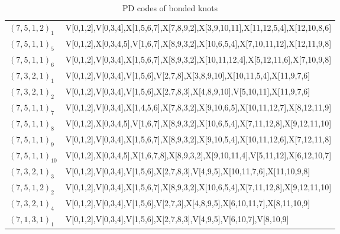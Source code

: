\begin{table}[h]
\begin{tabular}{ll}
$(7,5,1,2)_{1}$ & {\scriptsize\ttfamily V[0,1,2],V[0,3,4],X[1,5,6,7],X[7,8,9,2],X[3,9,10,11],X[11,12,5,4],X[12,10,8,6]} \\
$(7,5,1,1)_{5}$ & {\scriptsize\ttfamily V[0,1,2],X[0,3,4,5],V[1,6,7],X[8,9,3,2],X[10,6,5,4],X[7,10,11,12],X[12,11,9,8]} \\
$(7,5,1,1)_{6}$ & {\scriptsize\ttfamily V[0,1,2],V[0,3,4],X[1,5,6,7],X[8,9,3,2],X[10,11,12,4],X[5,12,11,6],X[7,10,9,8]} \\
$(7,3,2,1)_{1}$ & {\scriptsize\ttfamily V[0,1,2],V[0,3,4],V[1,5,6],V[2,7,8],X[3,8,9,10],X[10,11,5,4],X[11,9,7,6]} \\
$(7,3,2,1)_{2}$ & {\scriptsize\ttfamily V[0,1,2],V[0,3,4],V[1,5,6],X[2,7,8,3],X[4,8,9,10],V[5,10,11],X[11,9,7,6]} \\
$(7,5,1,1)_{7}$ & {\scriptsize\ttfamily V[0,1,2],V[0,3,4],X[1,4,5,6],X[7,8,3,2],X[9,10,6,5],X[10,11,12,7],X[8,12,11,9]} \\
$(7,5,1,1)_{8}$ & {\scriptsize\ttfamily V[0,1,2],X[0,3,4,5],V[1,6,7],X[8,9,3,2],X[10,6,5,4],X[7,11,12,8],X[9,12,11,10]} \\
$(7,5,1,1)_{9}$ & {\scriptsize\ttfamily V[0,1,2],V[0,3,4],X[1,5,6,7],X[8,9,3,2],X[9,10,5,4],X[10,11,12,6],X[7,12,11,8]} \\
$(7,5,1,1)_{10}$ & {\scriptsize\ttfamily V[0,1,2],X[0,3,4,5],X[1,6,7,8],X[8,9,3,2],X[9,10,11,4],V[5,11,12],X[6,12,10,7]} \\
$(7,3,2,1)_{3}$ & {\scriptsize\ttfamily V[0,1,2],V[0,3,4],V[1,5,6],X[2,7,8,3],V[4,9,5],X[10,11,7,6],X[11,10,9,8]} \\
$(7,5,1,2)_{2}$ & {\scriptsize\ttfamily V[0,1,2],V[0,3,4],X[1,5,6,7],X[8,9,3,2],X[10,6,5,4],X[7,11,12,8],X[9,12,11,10]} \\
$(7,3,2,1)_{4}$ & {\scriptsize\ttfamily V[0,1,2],V[0,3,4],V[1,5,6],V[2,7,3],X[4,8,9,5],X[6,10,11,7],X[8,11,10,9]} \\
$(7,1,3,1)_{1}$ & {\scriptsize\ttfamily V[0,1,2],V[0,3,4],V[1,5,6],X[2,7,8,3],V[4,9,5],V[6,10,7],V[8,10,9]} \\
\hline
\end{tabular}
\caption{PD codes of bonded knots}
\end{table}
